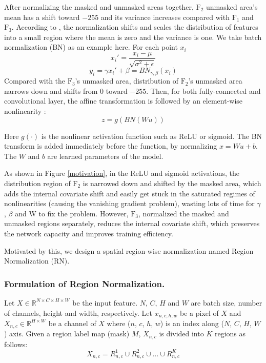 \documentclass[letterpaper]{article} %
\begin{document}
After normalizing the masked and unmasked areas together, $\text{F}_2$ unmasked area's mean has a shift toward $-255$ and its variance increases compared with $\text{F}_1$ and $\text{F}_3$. According to \cite{ioffe2015batch}, the normalization shifts and scales the distribution of features into a small region where the mean is zero and the variance is one. We take batch normalization (BN) as an example here.
For each point $x_i$
\begin{equation}
{x_i'}={\frac{x_i-\mu}{\sqrt{\sigma^2+\epsilon}}}
\end{equation}
\begin{equation}
{y_i}={\gamma x_i'+\beta}={BN_{\gamma,\beta}(x_i)}
\end{equation}
Compared with the $\text{F}_3$'s unmasked area, distribution of $\text{F}_2$'s unmasked area narrows down and shifts from $0$ toward $-255$.
Then, for both fully-connected and convolutional layer, the affine transformation is followed by an element-wise nonlinearity \cite{ioffe2015batch}:
\begin{equation}
{z}={g(BN(Wu))}
\end{equation}

Here $g(\cdot)$ is the nonlinear activation function such as ReLU or sigmoid. The BN transform is added immediately before the function, by normalizing $x = W u + b$. The $W$ and $b$ are learned parameters of the model.

As shown in Figure \ref{motivation}, in the ReLU and sigmoid activations, the distribution region of $\text{F}_2$ is narrowed down and shifted by the masked area, which adds the internal covariate shift and easily get stuck in the saturated regimes of nonlinearities (causing the vanishing gradient problem), wasting lots of time for $\gamma$, $\beta$ and W to fix the problem. However, $\text{F}_3$, normalized the masked and unmasked regions separately, reduces the internal covariate shift, which preserves the network capacity and improves training efficiency. 

Motivated by this, we design a spatial region-wise normalization named Region Normalization (RN).


\subsubsection{Formulation of Region Normalization.} 
Let $X \in \mathbb{R}^{N \times C \times H \times W}$ be the input feature. $N$, $C$, $H$ and $W$ are batch size, number of channels, height and width, respectively. Let $x_{n,c,h,w}$ be a pixel of $X$ and $X_{n,c} \in \mathbb{R}^{H \times W}$ be a channel of $X$ where ($n$, $c$, $h$, $w$) is an index along ($N$, $C$, $H$, $W$) axis. Given a region label map (mask) $M$, $X_{n,c}$ is divided into $K$ regions as follows:
\begin{equation}
X_{n,c}=R_{n,c}^{1} \cup R_{n,c}^{2} \cup ... \cup R_{n,c}^{K}
\end{equation} 
\end{document}
